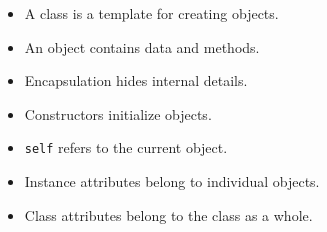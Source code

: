 \documentclass[11pt]{article}
\begin{document}
\begin{itemize}
    \item A class is a template for creating objects.
    \item An object contains data and methods.
    \item Encapsulation hides internal details.
    \item Constructors initialize objects.
    \item \verb|self| refers to the current object.
    \item Instance attributes belong to individual objects.
    \item Class attributes belong to the class as a whole.
\end{itemize}
\end{document}
